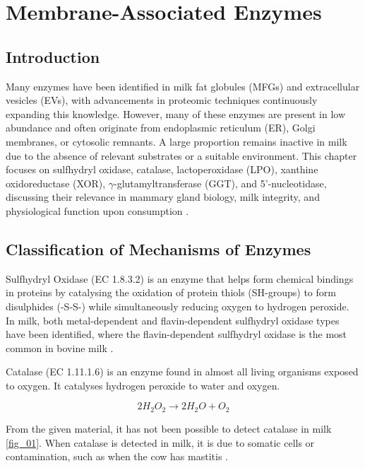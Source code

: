 \chapter{Membrane-Associated Enzymes}
\setlength{\headheight}{12.71342pt}
\addtolength{\topmargin}{-0.71342pt}

\section{Introduction}  
Many enzymes have been identified in milk fat globules (MFGs) and extracellular vesicles (EVs), with advancements in proteomic techniques continuously expanding this knowledge. However, many of these enzymes are present in low abundance and often originate from endoplasmic reticulum (ER), Golgi membranes, or cytosolic remnants. A large proportion remains inactive in milk due to the absence of relevant substrates or a suitable environment. This chapter focuses on sulfhydryl oxidase, catalase, lactoperoxidase (LPO), xanthine oxidoreductase (XOR), $\gamma$-glutamyltransferase (GGT), and 5'-nucleotidase, discussing their relevance in mammary gland biology, milk integrity, and physiological function upon consumption \cite*{RM_01}.  

\section{Classification of Mechanisms of Enzymes}
Sulfhydryl Oxidase (EC 1.8.3.2) is an enzyme that helps form chemical bindings in proteins by catalysing the oxidation of protein thiols (SH-groups) to form disulphides (-S-S-) while simultaneously reducing oxygen to hydrogen peroxide. In milk, both metal-dependent and flavin-dependent sulfhydryl oxidase types have been identified, where the flavin-dependent sulfhydryl oxidase is the most common in bovine milk \cite*{RM_01}.

\vline

Catalase (EC 1.11.1.6) is an enzyme found in almost all living organisms exposed to oxygen. It catalyses hydrogen peroxide to water and oxygen.

\begin{equation}
    2 H_2O_2 \rightarrow 2 H_2O + O_2
    \label{eq_01}    
\end{equation}

From the given material, it has not been possible to detect catalase in milk \ref*{fig_01}. When catalase is detected in milk, it is due to somatic cells or contamination, such as when the cow has mastitis \cite*{RM_01}.

